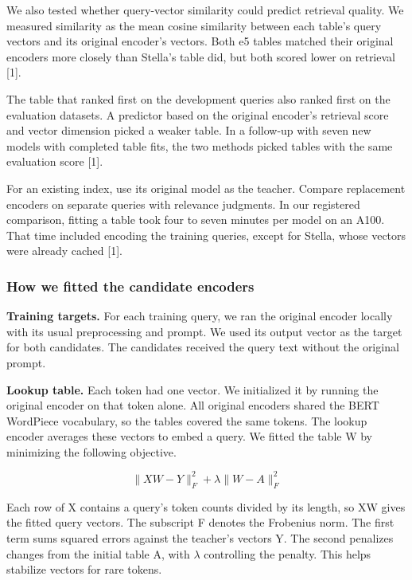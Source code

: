\documentclass[
  english,
  10pt,
]{article}
\begin{document}
We also tested whether query-vector similarity could predict retrieval
quality. We measured similarity as the mean cosine similarity between
each table's query vectors and its original encoder's vectors. Both e5
tables matched their original encoders more closely than Stella's table
did, but both scored lower on retrieval {[}1{]}.

The table that ranked first on the development queries also ranked first
on the evaluation datasets. A predictor based on the original encoder's
retrieval score and vector dimension picked a weaker table. In a
follow-up with seven new models with completed table fits, the two
methods picked tables with the same evaluation score {[}1{]}.

For an existing index, use its original model as the teacher. Compare
replacement encoders on separate queries with relevance judgments. In
our registered comparison, fitting a table took four to seven minutes
per model on an A100. That time included encoding the training queries,
except for Stella, whose vectors were already cached {[}1{]}.

\subsubsection{How we fitted the candidate
encoders}\label{how-we-fitted-the-candidate-encoders}

\textbf{Training targets.} For each training query, we ran the original
encoder locally with its usual preprocessing and prompt. We used its
output vector as the target for both candidates. The candidates received
the query text without the original prompt.

\textbf{Lookup table.} Each token had one vector. We initialized it by
running the original encoder on that token alone. All original encoders
shared the BERT WordPiece vocabulary, so the tables covered the same
tokens. The lookup encoder averages these vectors to embed a query. We
fitted the table W by minimizing the following objective.

\[\lVert XW - Y\rVert_F^2 + \lambda\lVert W - A\rVert_F^2\]

Each row of X contains a query's token counts divided by its length, so
XW gives the fitted query vectors. The subscript F denotes the Frobenius
norm. The first term sums squared errors against the teacher's vectors
Y. The second penalizes changes from the initial table A, with
\(\lambda\) controlling the penalty. This helps stabilize vectors for
rare tokens.
\end{document}
